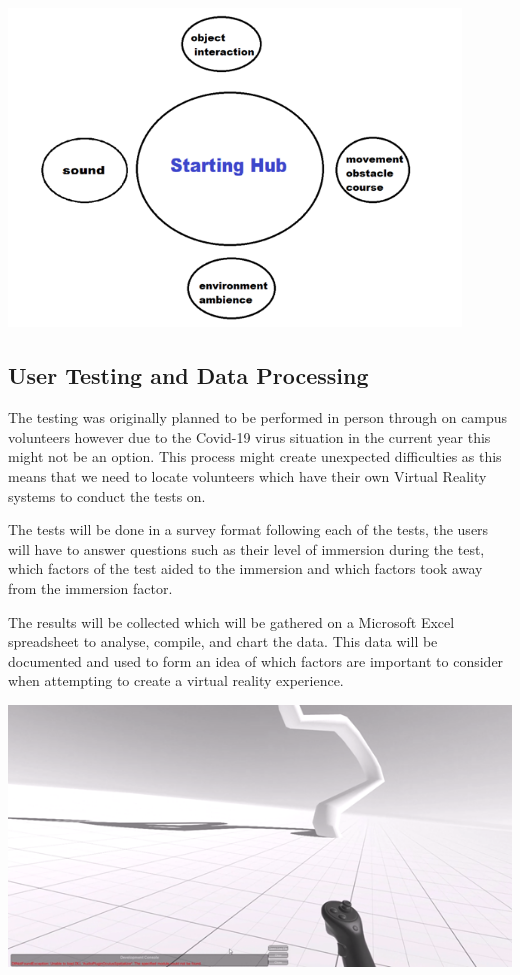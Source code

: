  \includegraphics[width=12cm]{Chapters/Picture2.png}

\subsection{User Testing and Data Processing}
The testing was originally planned to be performed in person through on campus volunteers however due to the Covid-19 virus situation in the current year this might not be an option. 
This process might create unexpected difficulties as this means that we need to locate volunteers which have their own Virtual Reality systems to conduct the tests on.  

The tests will be done in a survey format following each of the tests, the users will have to answer questions such as their level of immersion during the test, which factors of the test aided to the immersion and which factors took away from the immersion factor. 

The results will be collected which will be gathered on a Microsoft Excel spreadsheet to analyse, compile, and chart the data. This data will be documented and used to form an idea of which factors are important to consider when attempting to create a virtual reality experience. 



 \includegraphics[width=15cm]{Chapters/Picture3.png}





